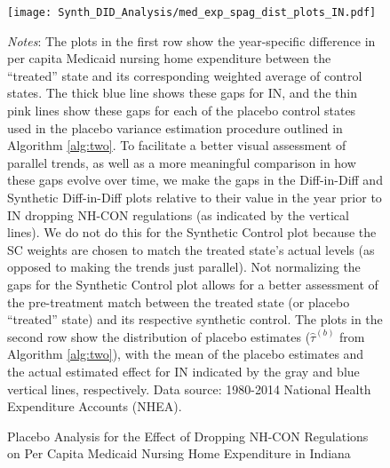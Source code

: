 \documentclass[../Main.tex]{subfiles}
\begin{document}
\newpage
\begin{figure}[t]
	\begin{center}
	\caption{\label{fig: med_exp_spag_plots_in} \centering Placebo Analysis for the Effect of Dropping NH-CON Regulations on Per Capita Medicaid Nursing Home Expenditure in Indiana}
    \texttt{[image: Synth\_DID\_Analysis/med\_exp\_spag\_dist\_plots\_IN.pdf]}
    \end{center}
    \footnotesize
		\textit{Notes}: The plots in the first row show the year-specific difference in per capita Medicaid nursing home expenditure between the ``treated'' state and its corresponding weighted average of control states. The thick blue line shows these gaps for IN, and the thin pink lines show these gaps for each of the placebo control states used in the placebo variance estimation procedure outlined in Algorithm \ref{alg:two}. To facilitate a better visual assessment of parallel trends, as well as a more meaningful comparison in how these gaps evolve over time, we make the gaps in the Diff-in-Diff and Synthetic Diff-in-Diff plots relative to their value in the year prior to IN dropping NH-CON regulations (as indicated by the vertical lines). We do not do this for the Synthetic Control plot because the SC weights are chosen to match the treated state's actual levels (as opposed to making the trends just parallel). Not normalizing the gaps for the Synthetic Control plot allows for a better assessment of the pre-treatment match between the treated state (or placebo ``treated'' state) and its respective synthetic control. The plots in the second row show the distribution of placebo estimates ($\hat{\tau}^{(b)}$ from Algorithm \ref{alg:two}), with the mean of the placebo estimates and the actual estimated effect for IN indicated by the gray and blue vertical lines, respectively. Data source: 1980-2014 National Health Expenditure Accounts (NHEA).
\end{figure}
\clearpage
\end{document}
